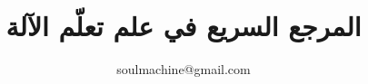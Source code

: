 \documentclass[graybox, envcountchap]{styles/svmult}
\author{soulmachine@gmail.com}
\title{المرجع السريع في علم تعلّم الآلة}
\begin{document}
\frontmatter
{}


%
%
%
%

\RLmulticolcolumns
\begin{multicols}{2}

\tableofcontents
\end{multicols}

\begin{english}

%
%

\end{english}


\RLmulticolcolumns


\begin{multicols}{2}
%

\mainmatter%
%

%
%
%
%
%
%
%
%
%
%
%
%
%
%
%
%
%
%
%
%
%
%
%
%
%
%
%
%

\backmatter%
\appendix
%
%
\printindex

\end{multicols}
\end{document}
